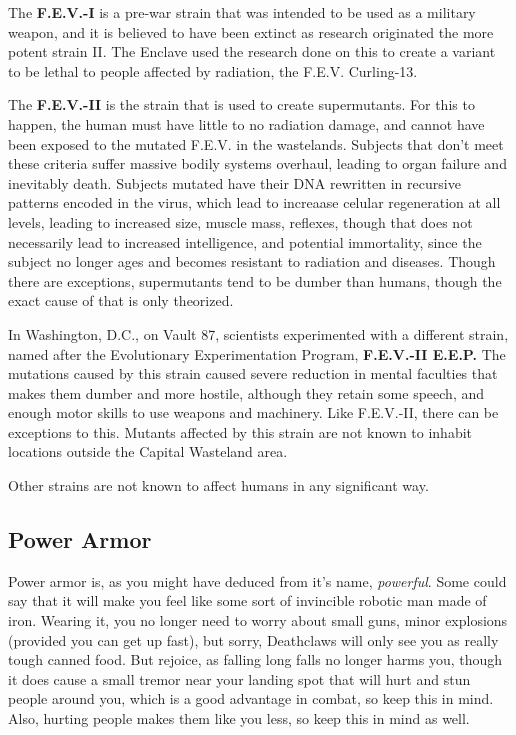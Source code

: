 \documentclass[11pt]{article} %
\begin{document}
The \textbf{F.E.V.-I} is a pre-war strain that was intended to be used as a military weapon, and it is believed to have been extinct as research originated the more potent strain II. The Enclave used the research done on this to create a variant to be lethal to people affected by radiation, the F.E.V. Curling-13.

The \textbf{F.E.V.-II} is the strain that is used to create supermutants. For this to happen, the human must have little to no radiation damage, and cannot have been exposed to the mutated F.E.V. in the wastelands. Subjects that don't meet these criteria suffer massive bodily systems overhaul, leading to organ failure and inevitably death. Subjects mutated have their DNA rewritten in recursive patterns encoded in the virus, which lead to increaase celular regeneration at all levels, leading to increased size, muscle mass, reflexes, though that does not necessarily lead to increased intelligence, and potential immortality, since the subject no longer ages and becomes resistant to radiation and diseases. Though there are exceptions, supermutants tend to be dumber than humans, though the exact cause of that is only theorized.

In Washington, D.C., on Vault 87, scientists experimented with a different strain, named after the  Evolutionary Experimentation Program, \textbf{F.E.V.-II E.E.P.} The mutations caused by this strain caused severe reduction in mental faculties that makes them dumber and more hostile, although they retain some speech, and enough motor skills to use weapons and machinery. Like F.E.V.-II, there can be exceptions to this. Mutants affected by this strain are not known to inhabit locations outside the Capital Wasteland area.

Other strains are not known to affect humans in any significant way.

\subsection{Power Armor}

Power armor is, as you might have deduced from it's name, \textit{powerful}. Some could say that it will make you feel like some sort of invincible robotic man made of iron. Wearing it, you no longer need to worry about small guns, minor explosions (provided you can get up fast), but sorry, Deathclaws will only see you as really tough canned food. But rejoice, as falling long falls no longer harms you, though it does cause a small tremor near your landing spot that will hurt and stun people around you, which is a good advantage in combat, so keep this in mind. Also, hurting people makes them like you less, so keep this in mind as well.
\end{document}
